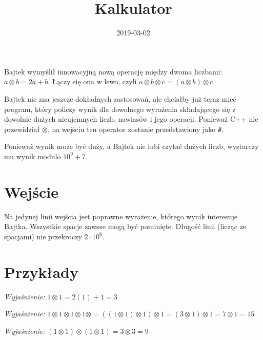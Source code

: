 \documentclass{sinol}
\title{Kalkulator}
\date{2019-03-02}
\begin{document}
\begin{tasktext}

Bajtek wymyślił innowacyjną nową operację między dwoma liczbami: $a \otimes b = 2a + b$. Łączy się ona w lewo, czyli $a \otimes b \otimes c = (a \otimes b) \otimes c$.

Bajtek nie zna jeszcze dokładnych zastosowań, ale chciałby już teraz mieć program, który policzy wynik dla dowolnego wyrażenia składającego się z dowolnie dużych nieujemnych liczb, nawiasów i jego operacji. Ponieważ C++ nie przewidział $\otimes$, na wejściu ten operator zostanie przedstawiony jako \texttt{\#}.

Ponieważ wynik może być duży, a Bajtek nie lubi czytać dużych liczb, wystarczy mu wynik modulo $10^9 + 7$.

\medskip

\section{Wejście}

Na jedynej linii wejścia jest poprawne wyrażenie, którego wynik interesuje Bajtka. Wszystkie spacje zawsze mogą być pominięte. Długość linii (licząc ze spacjami) nie przekroczy $2 \cdot 10^6$.

\medskip

\section{Przykłady}

\textit{Wyjaśnienie:} $1 \otimes 1 = 2(1) + 1 = 3$

\textit{Wyjaśnienie:} $1 \otimes 1 \otimes 1 \otimes 1 \otimes = ((1 \otimes 1) \otimes 1) \otimes 1 = (3 \otimes 1) \otimes 1 = 7 \otimes 1 = 15$

\textit{Wyjaśnienie:} $(1 \otimes 1) \otimes (1 \otimes 1) = 3 \otimes 3 = 9$

\end{tasktext}
\end{document}
